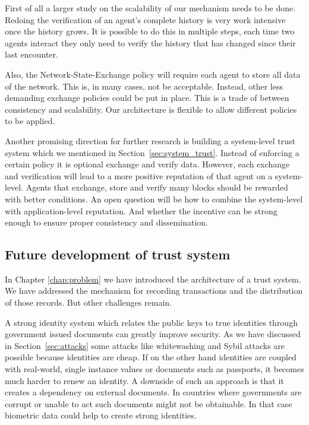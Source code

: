 First of all a larger study on the scalability of our mechanism
needs to be done. Redoing the verification of an agent's complete history is very work intensive once the 
history grows. It is possible to do this in multiple steps, each time two agents interact they only
need to verify the history that has changed since their last encounter. 

Also, the Network-State-Exchange policy will require each agent to store all data of the network. 
This is, in many cases, not be acceptable. Instead, other less demanding exchange policies could 
be put in place. This is a trade of between consistency and scalability. Our architecture is 
flexible to allow different policies to be applied.

Another promising direction for further research is building a system-level trust system which we
mentioned in Section~\ref{sec:system_trust}. Instead of enforcing a certain policy it is optional
exchange and verify data. However, each exchange and verification will lead to a more positive 
reputation of that agent on a system-level. Agents that exchange, store and verify many blocks should
be rewarded with better conditions. An open question will be how to combine the system-level with 
application-level reputation. And whether the incentive can be strong enough to ensure proper 
consistency and dissemination.


\subsection{Future development of trust system}
In Chapter \ref{chap:problem} we have introduced the architecture of a trust system. We have addressed
the mechanism for recording transactions and the distribution of those records. But
other challenges remain. 

A strong identity system which relates the public keys to true identities through government issued
documents can greatly improve security. As we have discussed in Section~\ref{sec:attacks} some 
attacks like whitewashing and Sybil attacks are possible because identities are cheap. If on the 
other hand identities are coupled with real-world, single instance values or documents such as 
passports, it becomes much harder to renew an identity. A downside of such an approach is that 
it creates a dependency on external documents. In countries where governments are corrupt or 
unable to act such documents might not be obtainable. In that case biometric data could help to 
create strong identities. 

